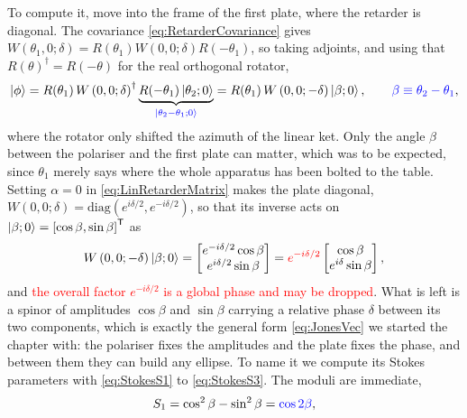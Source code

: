             To compute it, move into the frame of the first plate, where the retarder is diagonal. The covariance \ref{eq:RetarderCovariance} gives $W(\theta_1,0;\delta)=R(\theta_1)W(0,0;\delta)R(-\theta_1)$, so taking adjoints, and using that $R(\theta)^{\dagger}=R(-\theta)$ for the real orthogonal rotator,
            \begin{equation*}
                \ket{\phi} = R(\theta_1)\,W\left(0,0;\delta\right)^{\dagger}\underbrace{R(-\theta_1)\ket{\theta_2;0}}_{\textcolor{blue}{\ket{\theta_2-\theta_1;0}}} = R(\theta_1)\,W\left(0,0;-\delta\right)\ket{\beta;0}, \qquad \textcolor{blue}{\beta \equiv \theta_2-\theta_1},
            \end{equation*}
            where the rotator only shifted the azimuth of the linear ket. Only the angle $\beta$ between the polariser and the first plate can matter, which was to be expected, since $\theta_1$ merely says where the whole apparatus has been bolted to the table. Setting $\alpha=0$ in \ref{eq:LinRetarderMatrix} makes the plate diagonal, $W(0,0;\delta)=\text{diag}\left(e^{i\delta/2},e^{-i\delta/2}\right)$, so that its inverse acts on $\ket{\beta;0}=\left[\cos\beta,\sin\beta\right]^{\mathsf{T}}$ as
            \begin{equation}\label{eq:PhiBeforeRotation}
                W\left(0,0;-\delta\right)\ket{\beta;0} = \begin{bmatrix}e^{-i\delta/2}\cos\beta\\ e^{i\delta/2}\sin\beta\end{bmatrix} = \textcolor{red}{e^{-i\delta/2}}\begin{bmatrix}\cos\beta\\ e^{i\delta}\sin\beta\end{bmatrix},
            \end{equation}
            and \textcolor{red}{the overall factor $e^{-i\delta/2}$ is a global phase and may be dropped}. What is left is a spinor of amplitudes $\cos\beta$ and $\sin\beta$ carrying a relative phase $\delta$ between its two components, which is exactly the general form \ref{eq:JonesVec} we started the chapter with: the polariser fixes the amplitudes and the plate fixes the phase, and between them they can build any ellipse. To name it we compute its Stokes parameters with \ref{eq:StokesS1} to \ref{eq:StokesS3}. The moduli are immediate,
            \begin{equation*}
                S_1 = \cos^2\beta-\sin^2\beta = \textcolor{blue}{\cos2\beta} ,
            \end{equation*}

